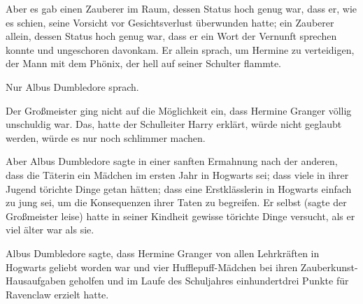 Aber es gab einen Zauberer im Raum, dessen Status hoch genug war, dass er, wie es schien, seine Vorsicht vor Gesichtsverlust überwunden hatte; ein Zauberer allein, dessen Status hoch genug war, dass er ein Wort der Vernunft sprechen konnte und ungeschoren davonkam. Er allein sprach, um Hermine zu verteidigen, der Mann mit dem Phönix, der hell auf seiner Schulter flammte.

Nur Albus Dumbledore sprach.

Der Großmeister ging nicht auf die Möglichkeit ein, dass Hermine Granger völlig unschuldig war. Das, hatte der Schulleiter Harry erklärt, würde nicht geglaubt werden, würde es nur noch schlimmer machen.

Aber Albus Dumbledore sagte in einer sanften Ermahnung nach der anderen, dass die Täterin ein Mädchen im ersten Jahr in Hogwarts sei; dass viele in ihrer Jugend törichte Dinge getan hätten; dass eine Erstklässlerin in Hogwarts einfach zu jung sei, um die Konsequenzen ihrer Taten zu begreifen. Er selbst (sagte der Großmeister leise) hatte in seiner Kindheit gewisse törichte Dinge versucht, als er viel älter war als sie.

Albus Dumbledore sagte, dass Hermine Granger von allen Lehrkräften in Hogwarts geliebt worden war und vier Hufflepuff-Mädchen bei ihren Zauberkunst-Hausaufgaben geholfen und im Laufe des Schuljahres einhundertdrei Punkte für Ravenclaw erzielt hatte.

